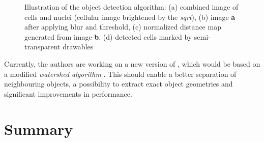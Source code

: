 \begin{figure}
\vspace*{.1in}
\begin{center}
\end{center}
\caption{\label{figure:analysis}
    Illustration of the object detection algorithm: (a) combined image of cells and nuclei (cellular image brightened by the {\em sqrt}), (b) image {\bf a} after applying blur and threshold, (c) normalized distance map generated from image {\bf b}, (d) detected cells marked by semi-transparent drawables
}
\end{figure}

Currently, the authors are working on a new version of , which would be based on a modified {\em watershed algorithm} \citep{R:Jones:2005}. This should enable a better separation of neighbouring objects, a possibility to extract exact object geometries and significant improvements in performance.

\section*{Summary}

